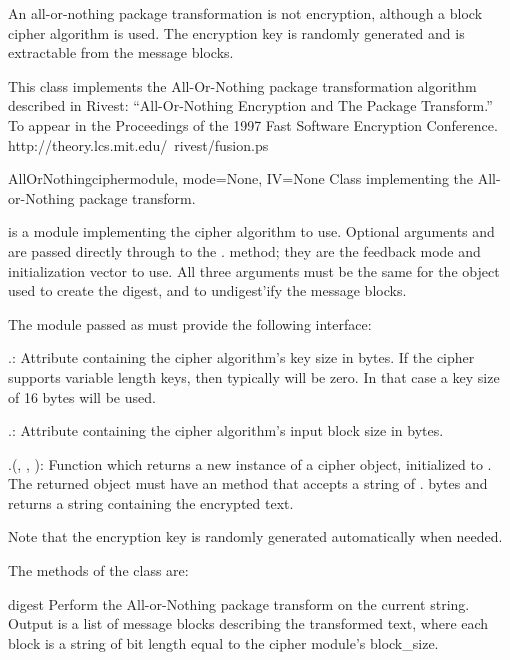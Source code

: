 \documentclass{howto}
\begin{document}
An all-or-nothing package transformation is not encryption, although a block
cipher algorithm is used.  The encryption key is randomly generated and is
extractable from the message blocks.

This class implements the All-Or-Nothing package transformation
algorithm described in Rivest: ``All-Or-Nothing Encryption and The
Package Transform.''  To appear in the Proceedings of the 1997 Fast
Software Encryption Conference.
http://theory.lcs.mit.edu/~rivest/fusion.ps

\begin{classdesc}{AllOrNothing}{ciphermodule, mode=None, IV=None}
Class implementing the All-or-Nothing package transform.

 is a module implementing the cipher algorithm to
use.  Optional arguments  and  are passed directly
through to the . method; they are the
feedback mode and initialization vector to use.  All three arguments
must be the same for the object used to create the digest, and to
undigest'ify the message blocks.

The module passed as  must provide the
following interface:

.: 
Attribute containing the cipher algorithm's key size in
bytes.  If the cipher supports variable length keys, then
typically  will be zero.  In that case a
key size of 16 bytes will be used.

.: 
Attribute containing the cipher algorithm's input block size
in bytes.

.(, , ):
                Function which returns a new instance of a cipher object,
                initialized to .  The returned object must have an
                 method that accepts a string of
                . bytes and returns a string containing
                the encrypted text.

Note that the encryption key is randomly generated automatically
when needed.  
\end{classdesc}

The methods of the  class are:

\begin{methoddesc}{digest}{}
Perform the All-or-Nothing package transform on the current
string.  Output is a list of message blocks describing the
transformed text, where each block is a string of bit length equal
to the cipher module's block_size.
\end{methoddesc}
\end{document}
